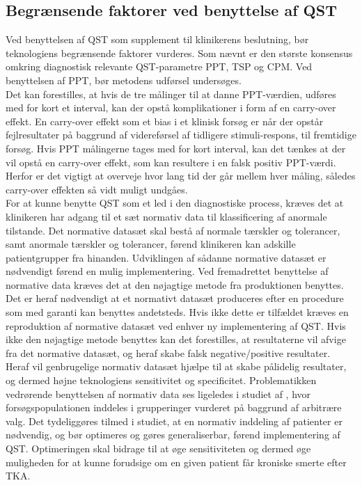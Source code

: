 \subsection{Begrænsende faktorer ved benyttelse af QST}
Ved benyttelsen af QST som supplement til klinikerens beslutning, bør teknologiens begrænsende faktorer vurderes. Som nævnt er den største konsensus omkring diagnostisk relevante QST-parametre PPT, TSP og CPM. Ved benyttelsen af PPT, bør metodens udførsel undersøges. \\
Det kan forestilles, at hvis de tre målinger til at danne PPT-værdien, udføres med for kort et interval, kan der opstå komplikationer i form af en carry-over effekt. En carry-over effekt som et bias i et klinisk forsøg er når der opstår fejlresultater på baggrund af videreførsel af tidligere stimuli-respons, til fremtidige forsøg. Hvis PPT målingerne tages med for kort interval, kan det tænkes at der vil opstå en carry-over effekt, som kan resultere i en falsk positiv PPT-værdi. Herfor er det vigtigt at overveje hvor lang tid der går mellem hver måling, således carry-over effekten så vidt muligt undgåes. \citep{Porta2008} \\ 
For at kunne benytte QST som et led i den diagnostiske process, kræves det at klinikeren har adgang til et sæt normativ data til klassificering af anormale tilstande. Det normative datasæt skal bestå af normale tærskler og tolerancer, samt anormale tærskler og tolerancer, førend klinikeren kan adskille patientgrupper fra hinanden. Udviklingen af sådanne normative datasæt er nødvendigt førend en mulig implementering. Ved fremadrettet benyttelse af normative data kræves det at den nøjagtige metode fra produktionen benyttes. Det er heraf nødvendigt at et normativt datasæt produceres efter en procedure som med garanti kan benyttes andetsteds. Hvis ikke dette er tilfældet kræves en reproduktion af normative datasæt ved enhver ny implementering af QST. Hvis ikke den nøjagtige metode benyttes kan det forestilles, at resultaterne vil afvige fra det normative datasæt, og heraf skabe falsk negative/positive resultater. Heraf vil genbrugelige normativ datasæt  hjælpe til at skabe pålidelig resultater, og dermed højne teknologiens sensitivitet og specificitet.  \citep{Yarnitsky1997} Problematikken vedrørende benyttelsen af normativ data ses ligeledes i studiet af , hvor forsøgspopulationen inddeles i grupperinger vurderet på baggrund af arbitrære valg. Det tydeliggøres tilmed i studiet, at en normativ inddeling af patienter er nødvendig, og bør optimeres og gøres generaliserbar, førend implementering af QST. Optimeringen skal bidrage til at øge sensitiviteten og dermed øge muligheden for at kunne forudsige om en given patient får kroniske smerte efter TKA. \\

